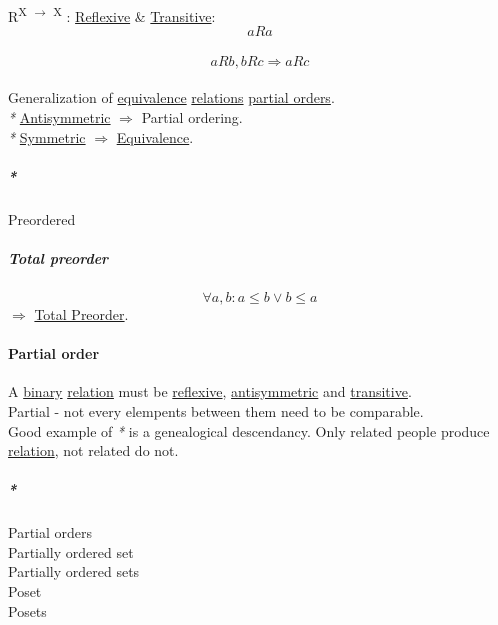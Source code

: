\documentclass[11pt]{article}
\begin{document}
R\textsuperscript{X \(\to\) X} : \hyperref[orgc0de209]{Reflexive} \& \hyperref[org46b1759]{Transitive}:\\
$$ aRa $$\\
$$ aRb, bRc \Rightarrow aRc $$\\

Generalization of \hyperref[orgbc0d2cd]{equivalence} \hyperref[org711476e]{relations} \hyperref[orgdff8b8b]{partial orders}.\\

\emph{*} \hyperref[org125842e]{Antisymmetric} \(\Rightarrow\) Partial ordering.\\
\emph{*} \hyperref[org63aee59]{Symmetric} \(\Rightarrow\) \hyperref[orgbc0d2cd]{Equivalence}.\\

\subparagraph{\emph{*}}
\label{sec:orge1eb1ad}

\label{org011c8d7}Preordered\\

\subparagraph{\label{org7382027}Total preorder}
\label{sec:orgc532e0e}

$$ \forall a,b : a \le b \lor b \le a $$ \(\Rightarrow\) \hyperref[org7382027]{Total Preorder}.\\

\paragraph{\label{org85e65b9}Partial order}
\label{sec:orgc7cc043}

A \hyperref[org57bd48f]{binary} \hyperref[orga5705a9]{relation} must be \hyperref[orgc0de209]{reflexive}, \hyperref[org125842e]{antisymmetric} and \hyperref[org46b1759]{transitive}.\\

Partial - not every elempents between them need to be comparable.\\

Good example of \emph{*} is a genealogical descendancy. Only related people produce \hyperref[orga5705a9]{relation}, not related do not.\\

\subparagraph{\emph{*}}
\label{sec:org1be72d1}

\label{orgdff8b8b}Partial orders\\
\label{org393daf8}Partially ordered set\\
\label{orgb7c8e64}Partially ordered sets\\
\label{orgb3a5cf4}Poset\\
\label{org8556951}Posets\\
\end{document}
